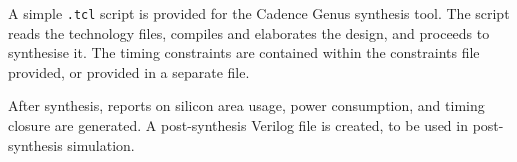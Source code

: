 A simple {\tt .tcl} script is provided for the Cadence Genus synthesis tool. The
script reads the technology files, compiles and elaborates the design, and
proceeds to synthesise it. The timing constraints are contained within the
constraints file provided, or provided in a separate file.

After synthesis, reports on silicon area usage, power consumption, and timing
closure are generated. A post-synthesis Verilog file is created, to be used in
post-synthesis simulation.


